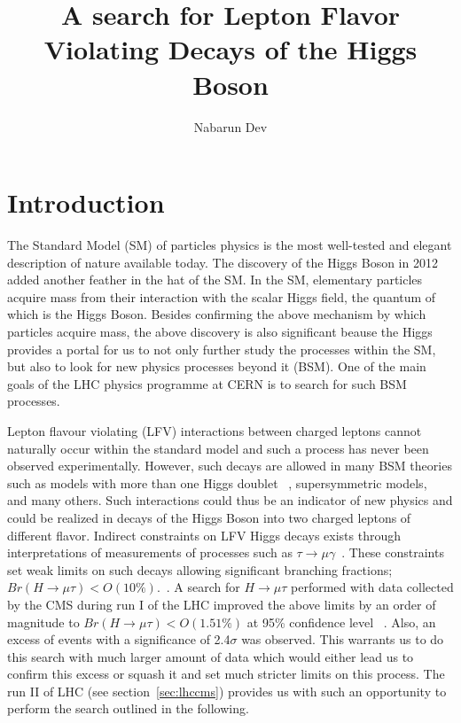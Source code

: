 \documentclass[a4paper,11pt]{article}
\title{\boldmath A search for Lepton Flavor Violating Decays of the Higgs Boson }
\author[a]{Nabarun Dev}
\affiliation[a]{Department of physics, University of Notre Dame, Indiana, USA}
\begin{document}
\linenumbers

\maketitle
\flushbottom

\section{Introduction}
\label{sec:intro}
The Standard Model (SM) of particles physics is the most well-tested and elegant description of nature available today. 
The discovery of the Higgs Boson in 2012 ~\cite{a} added another feather in the hat of the SM.
In the SM, elementary particles acquire mass from their interaction with the scalar Higgs field, the quantum of which is the  Higgs Boson.
Besides confirming the above mechanism by which particles acquire mass, the above discovery is also significant beause the Higgs provides a portal for us to not only further study the processes within the SM, but also to look for new physics processes beyond it (BSM). 
One of the main goals of the LHC  physics programme at CERN is to search for such BSM processes.


Lepton flavour violating (LFV) interactions between charged leptons cannot naturally occur within the standard model and such a process has never been observed experimentally.
However, such decays are allowed in many BSM theories such as models with more than one Higgs doublet ~\cite{b}, supersymmetric models,~\cite{c} and many others. 
Such interactions could thus be an indicator of new physics and could be realized in decays of the Higgs Boson into two charged leptons of different flavor.
Indirect constraints on LFV Higgs decays exists through interpretations of measurements of processes such as $\tau \rightarrow \mu \gamma$~\cite{d}.
These constraints set weak limits on such decays allowing significant branching fractions;$Br(H\rightarrow \mu \tau)<O(10\%).$~\cite{e}. 
A search for $H\rightarrow \mu \tau$ performed with data collected by the CMS during run I of the LHC  improved the above limits by an order of magnitude to $Br(H\rightarrow \mu \tau)<O(1.51\%)$ at 95\% confidence level ~\cite{df}. Also, an excess of events with a significance of 2.4$\sigma$ was observed. This warrants us to do this search with much larger amount of data which would either lead us to confirm this excess or squash it and set much stricter limits on this process. The run II of LHC (see section~\ref{sec:lhccms})  provides us with such an opportunity to perform the search outlined in the following.   
\end{document}
